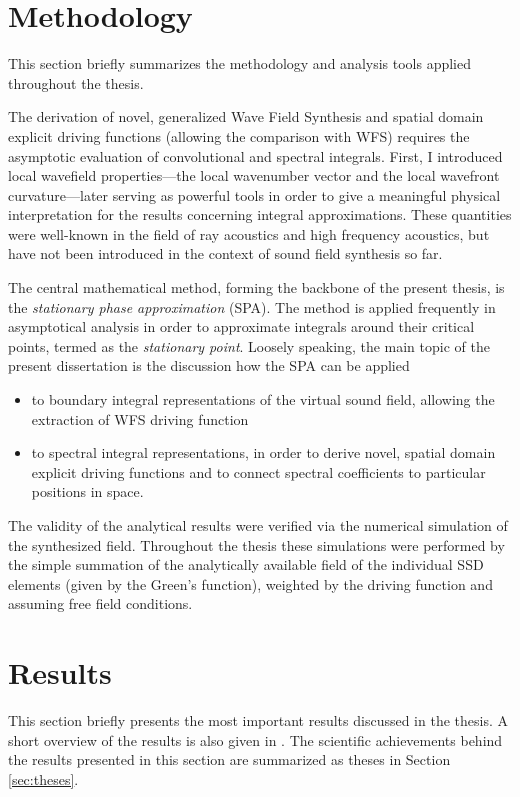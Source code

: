 \documentclass[10pt,twoside]{article}
\theoremstyle{thesisgroupstyle}
\theoremstyle{indented}
\begin{document}
\section{Methodology}

This section briefly summarizes the methodology and analysis tools applied throughout the thesis.

The derivation of novel, generalized Wave Field Synthesis and spatial domain explicit driving functions (allowing the comparison with WFS) requires the asymptotic evaluation of convolutional and spectral integrals.
First, I introduced local wavefield properties---the local wavenumber vector and the local wavefront curvature---later serving as powerful tools in order to give a meaningful physical interpretation for the results concerning integral approximations.
These quantities were well-known in the field of ray acoustics and high frequency acoustics, but have not been introduced in the context of sound field synthesis so far.

The central mathematical method, forming the backbone of the present thesis, is the \emph{stationary phase approximation} (SPA). 
The method is applied frequently in asymptotical analysis in order to approximate integrals around their critical points, termed as the \emph{stationary point}.
Loosely speaking, the main topic of the present dissertation is the discussion how the SPA can be applied 
\begin{itemize}
\item to boundary integral representations of the virtual sound field, allowing the extraction of WFS driving function 
\item to spectral integral representations, in order to derive novel, spatial domain explicit driving functions and to connect spectral coefficients to particular positions in space.
\end{itemize}
The validity of the analytical results were verified via the numerical simulation of the synthesized field.
Throughout the thesis these simulations were performed by the simple summation of the analytically available field of the individual SSD elements (given by the Green's function), weighted by the driving function and assuming free field conditions.

\section{Results}
This section briefly presents the most important results discussed in the thesis. 
A short overview of the results is also given in \cite{Firtha2019:daga_booklet}.
The scientific achievements behind the results presented in this section are summarized as theses in Section \ref{sec:theses}.
\end{document}
